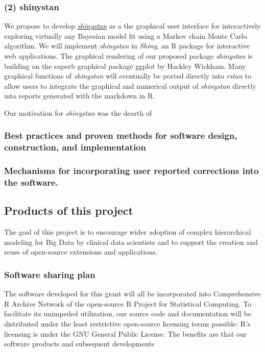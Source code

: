 \documentclass[11pt,notitlepage]{article}
\begin{document}
\subsubsection*{(2) shinystan}
We propose to develop \href{http://andrewgelman.com/2015/03/02/introducing-shinystan/}{\textit{shinystan}} as a the graphical user interface for interactively exploring virtually any Bayesian model fit using a Markov chain Monte Carlo algorithm. We will implement \textit{shinystan} in \textit{Shiny}, an R package for interactive web applications. The graphical rendering of our proposed package \textit{shinystan} is building on the superb graphical package ggplot by Hackley Wickham. Many graphical functions of \textit{shinystan} will eventually be ported directly into \textit{rstan} to allow users to integrate the graphical and numerical output of \textit{shinystan} directly into reports generated with the markdown in R.

Our motivation for \textit{shinystan} was the dearth of 
 
\subsubsection*{Best practices and proven methods for software design, construction, and implementation}
\subsubsection*{Mechanisms for incorporating user reported corrections into the software.}

\subsection*{Products of this project}
The goal of this project is to encourage wider adoption of complex hierarchical modeling for Big Data by clinical data scientists and to support the creation and reuse of open-source extensions and applications. 

\subsubsection*{Software sharing plan}
The software developed for this grant will all be incorporated into Comprehensive R Archive Network of the open-source R Project for Statistical Computing. To facilitate its unimpeded utilization, our source code and documentation will be distributed under the least restrictive open-source licensing terms possible: R's licensing is under the GNU General Public License. The benefits are that our software products and subsequent developments
\end{document}

